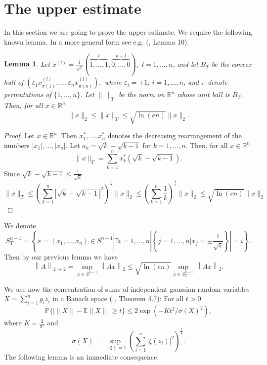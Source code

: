 \documentclass[12pt,a4paper]{article}
\newtheorem{lem}[satz]{Lemma}
\newcommand{\e}{\varepsilon}
\newcommand{\norm}[1]{\left \lVert#1 \right\rVert}
\begin{document}
\section{The upper estimate}\label{sec:part1}


In this section we are going to prove the upper estimate.
We require the following known lemma. In a more general form see e.g.
(\cite{Schue2}, Lemma 10).
\vskip 3mm


\begin{lem}\label{lem:netz} Let $x^{(l)}=\frac{1}{\sqrt{l}}(\overbrace{1,...,1}^{l},\overbrace{0,...,0}^{n-l}),$ $l=1,...,n$,
and let $B_T$ be the convex hull of 
$\left(\e_1x^{(l)}_{\pi(1)},...,\e_nx^{(l)}_{\pi(n)}\right),$
where $\e_i=\pm 1$, $i=1,...,n$, and $\pi$ denote permutations of $\{1,...,n\}$. 
Let $\|\ \|_{T}$ be the norm on $\mathbb R^{n}$ whose unit ball is
$B_{T}$.
Then,
for all $x\in\mathbb R^{n}$
$$
\|x\|_{2}\leq\|x\|_{T}\leq  \sqrt{\ln(en)}\|x\|_{2}.
$$
\end{lem}
\vskip 3mm

\begin{proof} Let $x\in\mathbb R^{n}$. Then $x^{*}_{1},\dots,x^{*}_{n}$
denotes the decreasing rearrangement of the numbers
$|x_{1}|,\dots,|x_{n}|$.
Let
 $a_{k}=\sqrt{k}-\sqrt{k-1}$ for $k=1,\dots,n$. Then, for
all $x\in\mathbb R^{n}$
$$
\|x\|_{T}=\sum_{k=1}^{n}x_{k}^{*}(\sqrt{k}-\sqrt{k-1}).
$$
Since $\sqrt{k}-\sqrt{k-1}\leq\frac{1}{\sqrt{k}}$
$$
\|x\|_{T}
\leq\left(\sum_{k=1}^{n}|\sqrt{k}-\sqrt{k-1}|^{2}\right)^{\frac{1}{2}}
\|x\|_{2}
\leq\left(\sum_{k=1}^{n}\frac{1}{k}\right)^{\frac{1}{2}}
\|x\|_{2}
\leq \sqrt{\ln(en)}\|x\|_{2}
$$
\end{proof}
\vskip 3mm

We denote  
$$
S_{T}^{n-1}=\left\{x=(x_1,...,x_n)\in S^{n-1}\left|\exists i=1,...,n \left|\left\{j=1,...,n|x_j=\pm\frac{1}{\sqrt{i}}\right\}\right|=i\right. \right\}.
$$
Then by our previous lemma we have
\begin{equation}\label{rem:netz}
\norm{A}_{2\rightarrow 2}=\sup\limits_{x\in S^{n-1}}\norm{Ax}_2\leq \sqrt{\ln(en)}\sup\limits_{x\in S_{T}^{n-1}}\norm{Ax}_2.
\end{equation}


We use now the concentration of sums of independent gaussian random variables
$X=\sum_{i=1}^{n}g_{i}z_{i}$ in a Banach space
( \cite{Pi}, Theorem 4.7):
 For all $t>0$
\begin{equation}\label{GaussConcPi}
\mathbb P\{|\|X\|-\mathbb E\|X\||\geq t\}
\leq 2\exp(-Kt^{2}/\sigma(X)^{2}),
\end{equation}
where $K=\frac{2}{\pi^{2}}$ and
\begin{equation}\label{GaussConcPi1}
\sigma(X)=\sup_{\|\xi\|=1}\left(\sum_{i=1}^{n}|\xi(z_{i})|^{2}\right)^{\frac{1}{2}}.
\end{equation}
The following lemma is an immediate consequence.
\vskip 3mm
\end{document}
